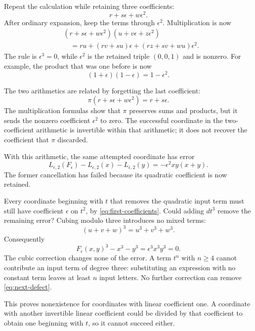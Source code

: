 \documentclass[11pt,letterpaper]{article}
\numberwithin{equation}{section}
\theoremstyle{definition}\newtheorem{example}[theorem]{Example}
\begin{document}
Repeat the calculation while retaining three coefficients:
\[
 r+s\epsilon+w\epsilon^2.
\]
After ordinary expansion, keep the terms through \(\epsilon^2\). Multiplication is now
\begin{equation}\label{eq:three-coefficients}
 \begin{split}
 &(r+s\epsilon+w\epsilon^2)(u+v\epsilon+z\epsilon^2)\\
 &\quad=ru+(rv+su)\epsilon+(rz+sv+wu)\epsilon^2.
 \end{split}
\end{equation}
The rule is \(\epsilon^3=0\), while \(\epsilon^2\) is the retained triple \((0,0,1)\) and is nonzero. For example, the product that was one before is now
\[
 (1+\epsilon)(1-\epsilon)=1-\epsilon^2.
\]

The two arithmetics are related by forgetting the last coefficient:
\[
 \pi(r+s\epsilon+w\epsilon^2)=r+s\epsilon.
\]
The multiplication formulas show that \(\pi\) preserves sums and products, but it sends the nonzero coefficient \(\epsilon^2\) to zero. The successful coordinate in the two-coefficient arithmetic is invertible within that arithmetic; it does not recover the coefficient that \(\pi\) discarded.

With this arithmetic, the same attempted coordinate has error
\begin{equation}\label{eq:next-defect}
 L_{\epsilon,2}(F_\epsilon)-L_{\epsilon,2}(x)-L_{\epsilon,2}(y)
 =-\epsilon^2xy(x+y).
\end{equation}
The former cancellation has failed because its quadratic coefficient is now retained.

Every coordinate beginning with \(t\) that removes the quadratic input term must still have coefficient \(\epsilon\) on \(t^2\), by \eqref{eq:first-coefficients}. Could adding \(d t^3\) remove the remaining error? Cubing modulo three introduces no mixed terms:
\[
 (u+v+w)^3=u^3+v^3+w^3.
\]
Consequently
\[
 F_\epsilon(x,y)^3-x^3-y^3=\epsilon^3x^3y^3=0.
\]
The cubic correction changes none of the error. A term \(t^n\) with \(n\ge4\) cannot contribute an input term of degree three: substituting an expression with no constant term leaves at least \(n\) input letters. No further correction can remove \eqref{eq:next-defect}.

This proves nonexistence for coordinates with linear coefficient one. A coordinate with another invertible linear coefficient could be divided by that coefficient to obtain one beginning with \(t\), so it cannot succeed either.
\end{document}
